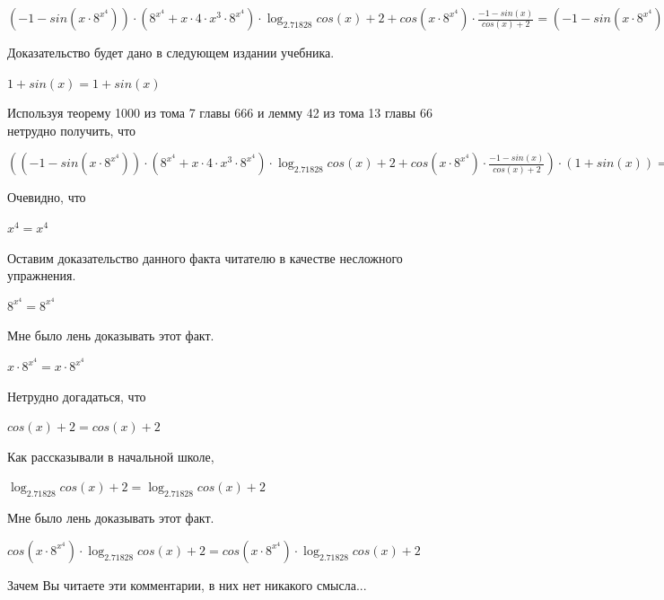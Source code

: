 \documentclass[12pt,a4paper,fleqn]{article}
\theoremstyle{definition}
\begin{document}
$( -1  - sin( x  \cdot { 8 }^{{ x }^{ 4 }})) \cdot ({ 8 }^{{ x }^{ 4 }} +  x  \cdot  4  \cdot { x }^{ 3 } \cdot { 8 }^{{ x }^{ 4 }}) \cdot \log_{ 2.71828 }{cos( x ) +  2 } + cos( x  \cdot { 8 }^{{ x }^{ 4 }}) \cdot \frac{ -1  - sin( x )}{cos( x ) +  2 }
 = ( -1  - sin( x  \cdot { 8 }^{{ x }^{ 4 }})) \cdot ({ 8 }^{{ x }^{ 4 }} +  x  \cdot  4  \cdot { x }^{ 3 } \cdot { 8 }^{{ x }^{ 4 }}) \cdot \log_{ 2.71828 }{cos( x ) +  2 } + cos( x  \cdot { 8 }^{{ x }^{ 4 }}) \cdot \frac{ -1  - sin( x )}{cos( x ) +  2 }
$

Доказательство будет дано в следующем издании учебника. 

$ 1  + sin( x ) =  1  + sin( x )$

Используя теорему 1000 из тома 7 главы 666 и лемму 42 из тома 13 главы 66 нетрудно получить, что 

$(( -1  - sin( x  \cdot { 8 }^{{ x }^{ 4 }})) \cdot ({ 8 }^{{ x }^{ 4 }} +  x  \cdot  4  \cdot { x }^{ 3 } \cdot { 8 }^{{ x }^{ 4 }}) \cdot \log_{ 2.71828 }{cos( x ) +  2 } + cos( x  \cdot { 8 }^{{ x }^{ 4 }}) \cdot \frac{ -1  - sin( x )}{cos( x ) +  2 }
) \cdot ( 1  + sin( x )) = (( -1  - sin( x  \cdot { 8 }^{{ x }^{ 4 }})) \cdot ({ 8 }^{{ x }^{ 4 }} +  x  \cdot  4  \cdot { x }^{ 3 } \cdot { 8 }^{{ x }^{ 4 }}) \cdot \log_{ 2.71828 }{cos( x ) +  2 } + cos( x  \cdot { 8 }^{{ x }^{ 4 }}) \cdot \frac{ -1  - sin( x )}{cos( x ) +  2 }
) \cdot ( 1  + sin( x ))$

Очевидно, что 

${ x }^{ 4 } = { x }^{ 4 }$

Оставим доказательство данного факта читателю в качестве несложного упражнения. 

${ 8 }^{{ x }^{ 4 }} = { 8 }^{{ x }^{ 4 }}$

Мне было лень доказывать этот факт.

$ x  \cdot { 8 }^{{ x }^{ 4 }} =  x  \cdot { 8 }^{{ x }^{ 4 }}$

Нетрудно догадаться, что 

$cos( x ) +  2  = cos( x ) +  2 $

Как рассказывали в начальной школе, 

$\log_{ 2.71828 }{cos( x ) +  2 } = \log_{ 2.71828 }{cos( x ) +  2 }$

Мне было лень доказывать этот факт.

$cos( x  \cdot { 8 }^{{ x }^{ 4 }}) \cdot \log_{ 2.71828 }{cos( x ) +  2 } = cos( x  \cdot { 8 }^{{ x }^{ 4 }}) \cdot \log_{ 2.71828 }{cos( x ) +  2 }$

Зачем Вы читаете эти комментарии, в них нет никакого смысла... 
\end{document}
